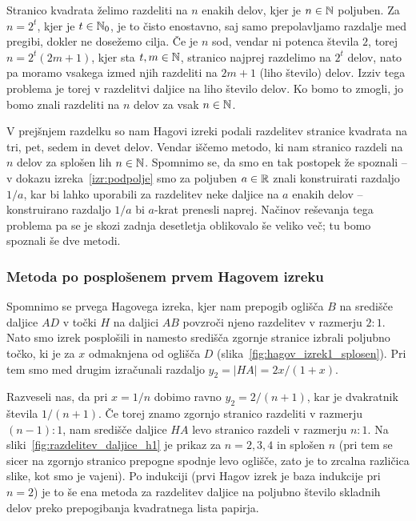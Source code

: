 Stranico kvadrata želimo razdeliti na $n$ enakih delov, kjer je $n \in \mathbb N$ poljuben. Za $n = 2^t$, kjer je $t \in \mathbb N_0$, je to čisto enostavno, saj samo prepolavljamo razdalje med pregibi, dokler ne dosežemo cilja. Če je $n$ sod, vendar ni potenca števila $2$, torej $n = 2^t(2m + 1)$, kjer sta $t, m \in \mathbb N$, stranico najprej razdelimo na $2^t$ delov, nato pa moramo vsakega izmed njih razdeliti na $2m + 1$ (liho število) delov. Izziv tega problema je torej v razdelitvi daljice na liho število delov. Ko bomo to zmogli, jo bomo znali razdeliti na $n$ delov za vsak $n \in \mathbb N$.

V prejšnjem razdelku so nam Hagovi izreki podali razdelitev stranice kvadrata na tri, pet, sedem in devet delov. Vendar iščemo metodo, ki nam stranico razdeli na $n$ delov za splošen lih $n \in \mathbb N$. Spomnimo se, da smo en tak postopek že spoznali -- v dokazu izreka~\ref{izr:podpolje} smo za poljuben $a \in \mathbb R$ znali konstruirati razdaljo $1/a$, kar bi lahko uporabili za razdelitev neke daljice na $a$ enakih delov -- konstruirano razdaljo $1/a$ bi $a$-krat prenesli naprej. Načinov reševanja tega problema pa se je skozi zadnja desetletja oblikovalo še veliko več; tu bomo spoznali še dve metodi.

\subsubsection*{Metoda po posplošenem prvem Hagovem izreku}
\label{podpogl:razdelitev_hag1_spl}

Spomnimo se prvega Hagovega izreka, kjer nam prepogib oglišča $B$ na središče daljice $AD$ v točki $H$ na daljici $AB$ povzroči njeno razdelitev v razmerju $2:1$. Nato smo izrek posplošili in namesto središča zgornje stranice izbrali poljubno točko, ki je za $x$ odmaknjena od oglišča $D$ (slika~\ref{fig:hagov_izrek1_splosen}). Pri tem smo med drugim izračunali razdaljo $y_2 = |HA| = 2x/(1+x)$.

Razveseli nas, da pri $x = 1/n$ dobimo ravno $y_2 = 2/(n+1)$, kar je dvakratnik števila $1/(n+1)$. Če torej znamo zgornjo stranico razdeliti v razmerju $(n-1):1$, nam središče daljice $HA$ levo stranico razdeli v razmerju $n:1$. Na sliki~\ref{fig:razdelitev_daljice_h1} je prikaz za $n = 2, 3, 4$ in splošen $n$ (pri tem se sicer na zgornjo stranico prepogne spodnje levo oglišče, zato je to zrcalna različica slike, kot smo je vajeni). Po indukciji (prvi Hagov izrek je baza indukcije pri $n=2$) je to še ena metoda za razdelitev daljice na poljubno število skladnih delov preko prepogibanja kvadratnega lista papirja.

